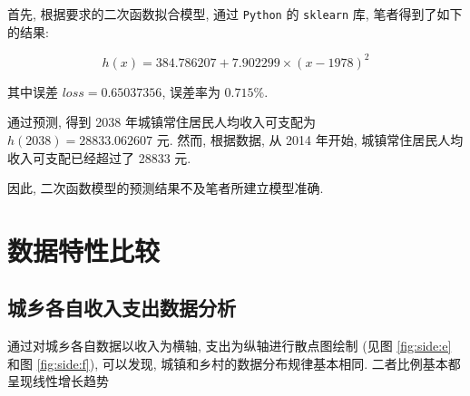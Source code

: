 \documentclass{article}
\begin{document}
首先, 根据要求的二次函数拟合模型, 通过 \texttt{Python} 的 \texttt{sklearn} 库, 笔者得到了如下的结果:

$$
  h\left(x\right) = 384.786207 + 7.902299 \times \left(x-1978\right)^2
$$

\par 其中误差 $loss = 0.65037356$, 误差率为 $0.715\%$.
\par 通过预测, 得到 2038 年城镇常住居民人均收入可支配为 $h\left(2038\right) = 28833.062607$ 元. 然而, 根据数据, 从 2014 年开始, 城镇常住居民人均收入可支配已经超过了 28833 元.\\
\par 因此, 二次函数模型的预测结果不及笔者所建立模型准确.

\section{数据特性比较}\label{sec:compare}

\subsection{城乡各自收入支出数据分析}

\par 通过对城乡各自数据以收入为横轴, 支出为纵轴进行散点图绘制 (见图 \ref{fig:side:e} 和图 \ref{fig:side:f}), 可以发现, 城镇和乡村的数据分布规律基本相同. 二者比例基本都呈现线性增长趋势\\
\end{document}

